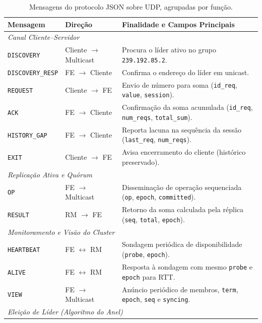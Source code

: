 \documentclass[12pt]{article}
\begin{document}
\begin{table}[!htb]
\centering
\caption{Mensagens do protocolo JSON sobre UDP, agrupadas por função.}
\label{tab:protocolo}
\scriptsize
\begin{tabularx}{\textwidth}{l l X}
\toprule
\textbf{Mensagem} & \textbf{Direção} & \textbf{Finalidade e Campos Principais} \\
\midrule
\multicolumn{3}{l}{\textit{Canal Cliente--Servidor}} \\
\texttt{DISCOVERY} & Cliente $\rightarrow$ Multicast & Procura o líder ativo no grupo \texttt{239.192.85.2}. \\
\texttt{DISCOVERY\_RESP} & FE $\rightarrow$ Cliente & Confirma o endereço do líder em unicast. \\
\texttt{REQUEST} & Cliente $\rightarrow$ FE & Envio de número para soma (\texttt{id\_req}, \texttt{value}, \texttt{session}). \\
\texttt{ACK} & FE $\rightarrow$ Cliente & Confirmação da soma acumulada (\texttt{id\_req}, \texttt{num\_reqs}, \texttt{total\_sum}). \\
\texttt{HISTORY\_GAP} & FE $\rightarrow$ Cliente & Reporta lacuna na sequência da sessão (\texttt{last\_req}, \texttt{num\_reqs}). \\
\texttt{EXIT} & Cliente $\rightarrow$ FE & Avisa encerramento do cliente (histórico preservado). \\
\midrule
\multicolumn{3}{l}{\textit{Replicação Ativa e Quórum}} \\
\texttt{OP} & FE $\rightarrow$ Multicast & Disseminação de operação sequenciada (\texttt{op}, \texttt{epoch}, \texttt{committed}). \\
\texttt{RESULT} & RM $\rightarrow$ FE & Retorno da soma calculada pela réplica (\texttt{seq}, \texttt{total}, \texttt{epoch}). \\
\midrule
\multicolumn{3}{l}{\textit{Monitoramento e Visão do Cluster}} \\
\texttt{HEARTBEAT} & FE $\leftrightarrow$ RM & Sondagem periódica de disponibilidade (\texttt{probe}, \texttt{epoch}). \\
\texttt{ALIVE} & FE $\leftrightarrow$ RM & Resposta à sondagem com mesmo \texttt{probe} e \texttt{epoch} para RTT. \\
\texttt{VIEW} & FE $\rightarrow$ Multicast & Anúncio periódico de membros, \texttt{term}, \texttt{epoch}, \texttt{seq} e \texttt{syncing}. \\
\midrule
\multicolumn{3}{l}{\textit{Eleição de Líder (Algoritmo do Anel)}} \\

\end{tabularx}
\end{table}
\end{document}
